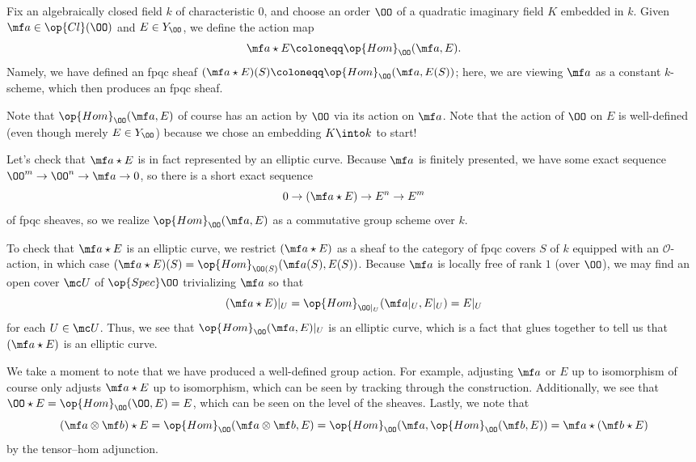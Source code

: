\documentclass[../notes.tex]{subfiles}
\begin{document}
\begin{definition}
	Fix an algebraically closed field $k$ of characteristic $0$, and choose an order $\OO$ of a quad\-ratic imaginary field $K$ embedded in $k$. Given $\mf a\in\op{Cl}(\OO)$ and $E\in Y_\OO$, we define the action map
	\[\mf a\star E\coloneqq\op{Hom}_\OO(\mf a,E).\]
	Namely, we have defined an fpqc sheaf $(\mf a\star E)(S)\coloneqq\op{Hom}_\OO(\mf a,E(S))$; here, we are viewing $\mf a$ as a constant $k$-scheme, which then produces an fpqc sheaf.
\end{definition}
\begin{remark}
	Note that $\op{Hom}_\OO(\mf a,E)$ of course has an action by $\OO$ via its action on $\mf a$. Note that the action of $\OO$ on $E$ is well-defined (even though merely $E\in Y_\OO$) because we chose an embedding $K\into k$ to start!
\end{remark}
\begin{remark}
	Let's check that $\mf a\star E$ is in fact represented by an elliptic curve. Because $\mf a$ is finitely presented, we have some exact sequence $\OO^m\to\OO^n\to\mf a\to0$, so there is a short exact sequence
	\[0\to(\mf a\star E)\to E^n\to E^m\]
	of fpqc sheaves, so we realize $\op{Hom}_\OO(\mf a,E)$ as a commutative group scheme over $k$.
	
	To check that $\mf a\star E$ is an elliptic curve, we restrict $(\mf a\star E)$ as a sheaf to the category of fpqc covers $S$ of $k$ equipped with an $\mathcal O$-action, in which case $(\mf a\star E)(S)=\op{Hom}_{\OO(S)}(\mf a(S),E(S))$. Because $\mf a$ is locally free of rank $1$ (over $\OO$), we may find an open cover $\mc U$ of $\op{Spec}\OO$ trivializing $\mf a$ so that
	\[(\mf a\star E)|_U=\op{Hom}_{\OO|_U}(\mf a|_U,E|_U)=E|_U\]
	for each $U\in\mc U$. Thus, we see that $\op{Hom}_\OO(\mf a,E)|_U$ is an elliptic curve, which is a fact that glues together to tell us that $(\mf a\star E)$ is an elliptic curve.
\end{remark}
\begin{remark}
	We take a moment to note that we have produced a well-defined group action. For example, adjusting $\mf a$ or $E$ up to isomorphism of course only adjusts $\mf a\star E$ up to isomorphism, which can be seen by tracking through the construction. Additionally, we see that $\OO\star E=\op{Hom}_\OO(\OO,E)=E$, which can be seen on the level of the sheaves. Lastly, we note that
	\[(\mf a\otimes\mf b)\star E=\op{Hom}_\OO(\mf a\otimes\mf b,E)=\op{Hom}_\OO(\mf a,\op{Hom}_\OO(\mf b,E))=\mf a\star(\mf b\star E)\]
	by the tensor--hom adjunction.
\end{remark}
\end{document}
